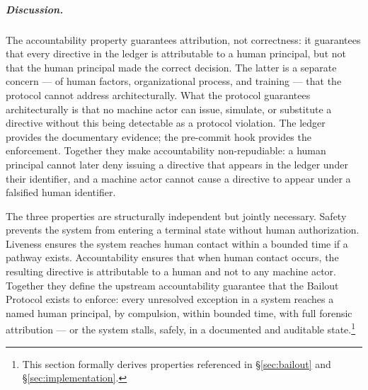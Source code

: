 \subparagraph{Discussion.} The accountability property guarantees attribution, not correctness: it guarantees that every directive in the ledger is attributable to a human principal, but not that the human principal made the correct decision. The latter is a separate concern — of human factors, organizational process, and training — that the protocol cannot address architecturally. What the protocol guarantees architecturally is that no machine actor can issue, simulate, or substitute a directive without this being detectable as a protocol violation. The ledger provides the documentary evidence; the pre-commit hook provides the enforcement. Together they make accountability non-repudiable: a human principal cannot later deny issuing a directive that appears in the ledger under their identifier, and a machine actor cannot cause a directive to appear under a falsified human identifier.

The three properties are structurally independent but jointly necessary. Safety prevents the system from entering a terminal state without human authorization. Liveness ensures the system reaches human contact within a bounded time if a pathway exists. Accountability ensures that when human contact occurs, the resulting directive is attributable to a human and not to any machine actor. Together they define the upstream accountability guarantee that the Bailout Protocol exists to enforce: every unresolved exception in a \bxthree{} system reaches a named human principal, by compulsion, within bounded time, with full forensic attribution — or the system stalls, safely, in a documented and auditable state.\footnote{This section formally derives properties referenced in \S\ref{sec:bailout} and \S\ref{sec:implementation}.}
